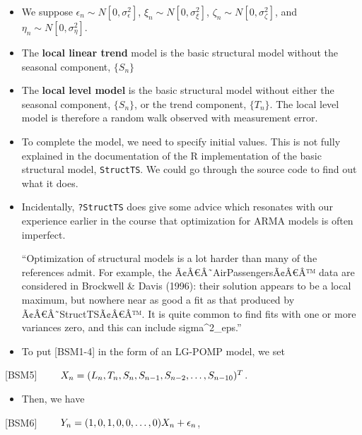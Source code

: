 \documentclass[]{article}
\newcommand{\euro}{€}
\providecommand{\tightlist}{%
  \setlength{\itemsep}{0pt}\setlength{\parskip}{0pt}}
\begin{document}
\begin{itemize}
\item
  We suppose \(\epsilon_n\sim N[0,\sigma^2_\epsilon]\),
  \(\xi_n\sim N[0,\sigma^2_\xi]\), \(\zeta_n\sim N[0,\sigma^2_\zeta]\),
  and \(\eta_n\sim N[0,\sigma^2_\eta]\).
\item
  The \textbf{local linear trend} model is the basic structural model
  without the seasonal component, \(\{S_n\}\)
\item
  The \textbf{local level model} is the basic structural model without
  either the seasonal component, \(\{S_n\}\), or the trend component,
  \(\{T_n\}\). The local level model is therefore a random walk observed
  with measurement error.
\item
  To complete the model, we need to specify initial values. This is not
  fully explained in the documentation of the R implementation of the
  basic structural model, \texttt{StructTS}. We could go through the
  source code to find out what it does.
\item
  Incidentally, \texttt{?StructTS} does give some advice which resonates
  with our experience earlier in the course that optimization for ARMA
  models is often imperfect.

  ``Optimization of structural models is a lot harder than many of the
  references admit. For example, the
  Ã¢Â\euro{}Â˜AirPassengersÃ¢Â\euro{}Â™ data are considered in Brockwell
  \& Davis (1996): their solution appears to be a local maximum, but
  nowhere near as good a fit as that produced by
  Ã¢Â\euro{}Â˜StructTSÃ¢Â\euro{}Â™. It is quite common to find fits with
  one or more variances zero, and this can include sigma\^{}2\_eps.''
\item
  To put {[}BSM1-4{]} in the form of an LG-POMP model, we set
\end{itemize}

{[}BSM5{]}
\(\quad\quad X_n = (L_n,T_n,S_n, S_{n-1}, S_{n-2}, \dots,S_{n-10})^{\scriptsize{T}}\).

\begin{itemize}
\tightlist
\item
  Then, we have
\end{itemize}

{[}BSM6{]} \(\quad\quad Y_n = (1,0,1,0,0,\dots, 0) X_n + \epsilon_n\),
\end{document}
